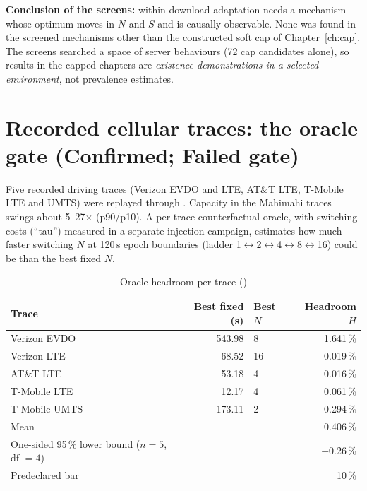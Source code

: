 \begin{keyidea}
\textbf{Conclusion of the screens:} within-download adaptation needs a mechanism whose optimum moves in $N$ and $S$ and is causally observable. None was found in the screened mechanisms other than the constructed soft cap of Chapter~\ref{ch:cap}. The screens searched a space of server behaviours (72 cap candidates alone), so results in the capped chapters are \emph{existence demonstrations in a selected environment}, not prevalence estimates.
\end{keyidea}

\section{Recorded cellular traces: the oracle gate (Confirmed; Failed gate)}
Five recorded driving traces (Verizon EVDO and LTE, AT\&T LTE, T-Mobile LTE and UMTS) were replayed through . Capacity in the Mahimahi traces swings about 5--27$\times$ (p90/p10). A per-trace counterfactual oracle, with switching costs (``tau'') measured in a separate injection campaign, estimates how much faster switching $N$ at 120\,s epoch boundaries (ladder 1$\leftrightarrow$2$\leftrightarrow$4$\leftrightarrow$8$\leftrightarrow$16) could be than the best fixed $N$.

\begin{table}[H]\centering\small
\caption{Oracle headroom per trace ()}\label{tab:oracle}
\begin{tabular}{@{}lrlr@{}}
\toprule
\textbf{Trace} & \textbf{Best fixed (s)} & \textbf{Best $N$} & \textbf{Headroom $H$}\\
\midrule
Verizon EVDO & 543.98 & 8 & 1.641\,\%\\
Verizon LTE & 68.52 & 16 & 0.019\,\%\\
AT\&T LTE & 53.18 & 4 & 0.016\,\%\\
T-Mobile LTE & 12.17 & 4 & 0.061\,\%\\
T-Mobile UMTS & 173.11 & 2 & 0.294\,\%\\
\midrule
Mean & & & 0.406\,\%\\
One-sided 95\,\% lower bound ($n=5$, df $=4$) & & & $-0.26$\,\%\\
Predeclared bar & & & 10\,\%\\
\bottomrule
\end{tabular}
\end{table}

